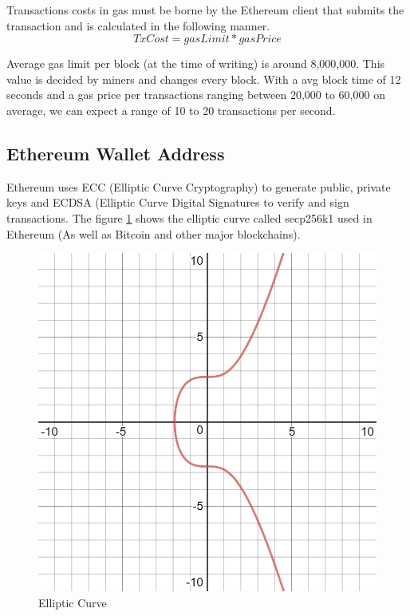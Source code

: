 \documentclass[11pt,openright]{report}
\begin{document}
Transactions costs in gas must be borne by the Ethereum client that submits the transaction and is calculated in the following manner.
\begin{equation}
    TxCost = gasLimit * gasPrice
\end{equation}

Average gas limit per block (at the time of writing) is around 8,000,000. This value is decided by miners and changes every block. With a avg block time of 12 seconds and a gas price per transactions ranging between 20,000 to 60,000 on average, we can expect a range of 10 to 20 transactions per second. 

\subsection{Ethereum Wallet Address}
Ethereum uses ECC (Elliptic Curve Cryptography) to generate public, private keys and ECDSA (Elliptic Curve Digital Signatures to verify and sign transactions. The figure \ref{fig:elliptic_curve} shows the elliptic curve called secp256k1 used in Ethereum (As well as Bitcoin and other major blockchains).

\begin{figure}
	\centering
	\includegraphics[scale=0.5]{images/ecc.png}
	\caption{Elliptic Curve}
	\label{fig:elliptic_curve}
\end{figure}
\end{document}
